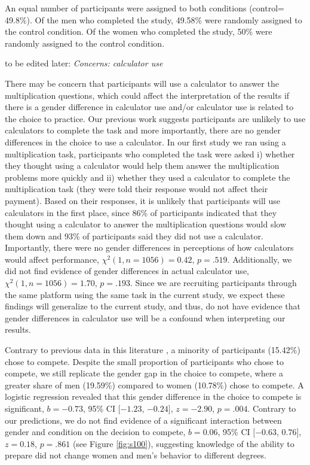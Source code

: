 \documentclass[a4paper, nobind]{templates/ociamthesis}
\begin{document}
An equal number of participants were assigned to both conditions (control= 49.8\%). Of the men who completed the study, 49.58\% were randomly assigned to the control condition. Of the women who completed the study, 50\% were randomly assigned to the control condition.

to be edited later:
\emph{Concerns: calculator use}

There may be concern that participants will use a calculator to answer the multiplication questions, which could affect the interpretation of the results if there is a gender difference in calculator use and/or calculator use is related to the choice to practice. Our previous work suggests participants are unlikely to use calculators to complete the task and more importantly, there are no gender differences in the choice to use a calculator. In our first study we ran using a multiplication task, participants who completed the task were asked i) whether they thought using a calculator would help them answer the multiplication problems more quickly and ii) whether they used a calculator to complete the multiplication task (they were told their response would not affect their payment). Based on their responses, it is unlikely that participants will use calculators in the first place, since 86\% of participants indicated that they thought using a calculator to answer the multiplication questions would slow them down and 93\% of participants said they did not use a calculator. Importantly, there were no gender differences in perceptions of how calculators would affect performance, \(\chi^2(1, n = 1056) = 0.42\), \(p = .519\). Additionally, we did not find evidence of gender differences in actual calculator use, \(\chi^2(1, n = 1056) = 1.70\), \(p = .193\). Since we are recruiting participants through the same platform using the same task in the current study, we expect these findings will generalize to the current study, and thus, do not have evidence that gender differences in calculator use will be a confound when interpreting our results.

Contrary to previous data in this literature \autocite{Niederle2007}, a minority of participants (15.42\%) chose to compete. Despite the small proportion of participants who chose to compete, we still replicate the gender gap in the choice to compete, where a greater share of men (19.59\%) compared to women (10.78\%) chose to compete. A logistic regression revealed that this gender difference in the choice to compete is significant, \(b = -0.73\), 95\% CI \([-1.23\), \(-0.24]\), \(z = -2.90\), \(p = .004\). Contrary to our predictions, we do not find evidence of a significant interaction between gender and condition on the decision to compete, \(b = 0.06\), 95\% CI \([-0.63\), \(0.76]\), \(z = 0.18\), \(p = .861\) (see Figure \ref{fig:s100}), suggesting knowledge of the ability to prepare did not change women and men's behavior to different degrees.
\end{document}
